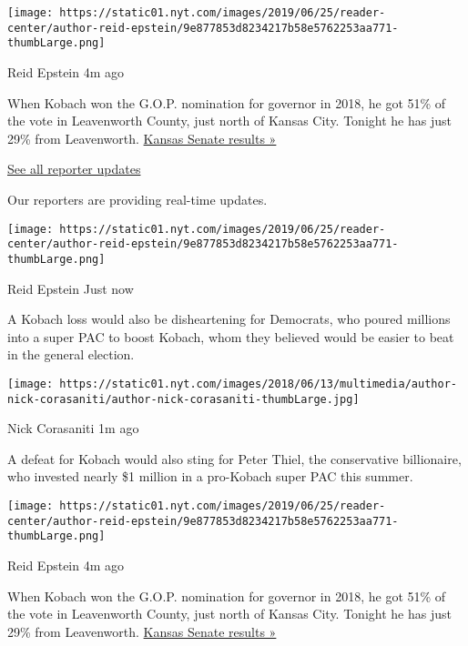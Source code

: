 \texttt{[image: https://static01.nyt.com/images/2019/06/25/reader-center/author-reid-epstein/9e877853d8234217b58e5762253aa771-thumbLarge.png]}

Reid Epstein 4m ago

When Kobach won the G.O.P. nomination for governor in 2018, he got 51\%
of the vote in Leavenworth County, just north of Kansas City. Tonight he
has just 29\% from Leavenworth.
\href{https://www.nytimes.com/interactive/2020/08/04/us/elections/results-kansas-senate-primary-election.html?action=click\&module=ELEX_results\&pgtype=Interactive\&region=ReporterUpdates}{Kansas
Senate results »}

\href{https://www.nytimes.com/interactive/2020/08/04/us/elections/live-analysis-arizona-kansas-michigan-missouri-primaries.html?action=click\&module=ELEX_results\&pgtype=Interactive\&region=Component}{See
all reporter updates}

Our reporters are providing real-time updates.

\texttt{[image: https://static01.nyt.com/images/2019/06/25/reader-center/author-reid-epstein/9e877853d8234217b58e5762253aa771-thumbLarge.png]}

Reid Epstein Just now

A Kobach loss would also be disheartening for Democrats, who poured
millions into a super PAC to boost Kobach, whom they believed would be
easier to beat in the general election.

\texttt{[image: https://static01.nyt.com/images/2018/06/13/multimedia/author-nick-corasaniti/author-nick-corasaniti-thumbLarge.jpg]}

Nick Corasaniti 1m ago

A defeat for Kobach would also sting for Peter Thiel, the conservative
billionaire, who invested nearly \$1 million in a pro-Kobach super PAC
this summer.

\texttt{[image: https://static01.nyt.com/images/2019/06/25/reader-center/author-reid-epstein/9e877853d8234217b58e5762253aa771-thumbLarge.png]}

Reid Epstein 4m ago

When Kobach won the G.O.P. nomination for governor in 2018, he got 51\%
of the vote in Leavenworth County, just north of Kansas City. Tonight he
has just 29\% from Leavenworth.
\href{https://www.nytimes.com/interactive/2020/08/04/us/elections/results-kansas-senate-primary-election.html?action=click\&module=ELEX_results\&pgtype=Interactive\&region=ReporterUpdates}{Kansas
Senate results »}

